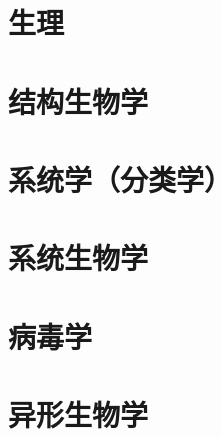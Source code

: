 \documentclass[UTF8]{../NatureUniverse}
\begin{document}
\section{生理}
\section{结构生物学}
\section{系统学（分类学）}
\section{系统生物学}
\section{病毒学}
\section{异形生物学}
\end{document}
